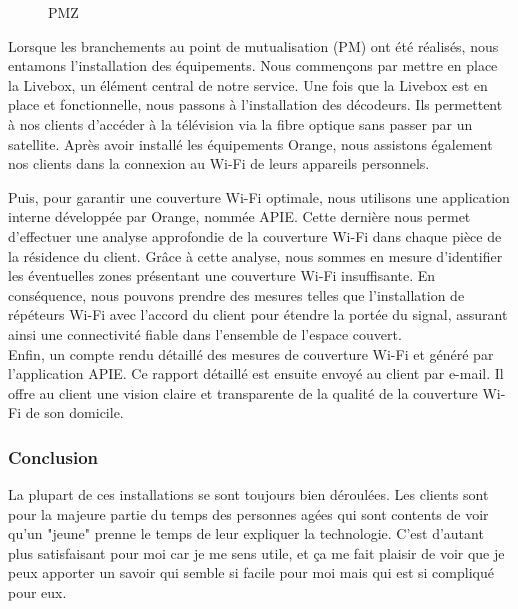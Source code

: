 \documentclass[12pt, a4paper]{article}
\begin{document}
\begin{figure}[htbp]
\begin{minipage}[b]{0.4\textwidth}
      \caption{PMZ}
    \end{minipage}
\end{figure}

Lorsque les branchements au point de mutualisation (PM) ont été réalisés,
nous entamons l'installation des équipements. Nous commençons par mettre en place la Livebox,
un élément central de notre service.
Une fois que la Livebox est en place et fonctionnelle,
nous passons à l'installation des décodeurs. Ils
permettent à nos clients d'accéder à la télévision via la fibre optique
sans passer par un satellite. 
Après avoir installé les équipements Orange, nous assistons également
nos clients dans la connexion au Wi-Fi de leurs appareils personnels.

\newpage
Puis, pour garantir une couverture Wi-Fi optimale, nous utilisons une
application interne développée par Orange,
nommée APIE. Cette dernière nous permet d'effectuer
une analyse approfondie de la couverture Wi-Fi dans chaque pièce
de la résidence du client. Grâce à cette analyse,
nous sommes en mesure d'identifier les éventuelles zones
présentant une couverture Wi-Fi insuffisante. En conséquence,
nous pouvons prendre des mesures telles que
l'installation de répéteurs Wi-Fi avec l'accord du client 
pour étendre la portée du signal,
assurant ainsi une connectivité fiable dans l'ensemble de l'espace couvert.\\

Enfin, un compte rendu détaillé des mesures de couverture Wi-Fi
et généré par l'application APIE. Ce rapport détaillé est
ensuite envoyé au client par e-mail. Il offre au client une
vision claire et transparente de la qualité de la couverture Wi-Fi
de son domicile.
\subsubsection{Conclusion}
La plupart de ces installations se sont toujours 
bien déroulées. Les clients sont pour la majeure partie
du temps des personnes agées qui sont contents 
de voir qu'un "jeune" prenne le temps de leur 
expliquer la technologie. C'est d'autant plus 
satisfaisant pour moi car je me sens utile, et 
ça me fait plaisir de voir que je peux 
apporter un savoir qui semble si facile pour moi 
mais qui est si compliqué pour eux.\\
\end{document}
